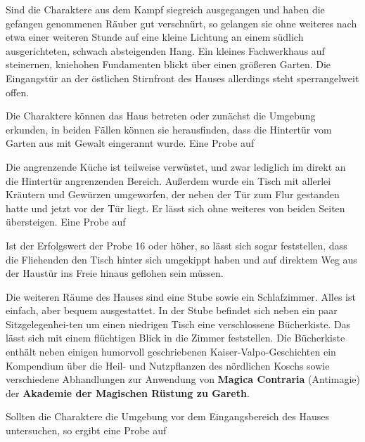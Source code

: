 


Sind die Charaktere aus dem Kampf siegreich ausgegangen und haben die gefangen genommenen Räuber gut verschnürt, so gelangen sie ohne weiteres nach etwa einer weiteren Stunde auf eine kleine Lichtung an einem südlich ausgerichteten, schwach absteigenden Hang. Ein kleines Fachwerkhaus auf steinernen, kniehohen Fundamenten blickt über einen größeren Garten. Die Eingangstür an der östlichen Stirnfront des Hauses allerdings steht sperrangelweit offen.


Die Charaktere können das Haus betreten oder zunächst die Umgebung erkunden, in beiden Fällen können sie herausfinden, dass die Hintertür vom Garten aus mit Gewalt eingerannt wurde. Eine Probe auf 



Die angrenzende Küche ist teilweise verwüstet, und zwar lediglich im direkt an die Hintertür angrenzenden Bereich. Außerdem wurde ein Tisch mit allerlei Kräutern und Gewürzen umgeworfen, der neben der Tür zum Flur gestanden hatte und jetzt vor der Tür liegt. Er lässt sich ohne weiteres von beiden Seiten übersteigen. Eine Probe auf 


Ist der Erfolgswert der Probe 16 oder höher, so lässt sich sogar feststellen, dass die Fliehenden den Tisch hinter sich umgekippt haben und auf direktem Weg aus der Haustür ins Freie hinaus geflohen sein müssen. 


Die weiteren Räume des Hauses sind eine Stube sowie ein Schlafzimmer. Alles ist einfach, aber bequem ausgestattet. In der Stube befindet sich neben ein paar Sitzgelegenhei-ten um einen niedrigen Tisch eine verschlossene Bücherkiste. Das lässt sich mit einem flüchtigen Blick in die Zimmer feststellen. Die Bücherkiste enthält neben einigen humorvoll geschriebenen Kaiser-Valpo-Geschichten ein Kompendium über die Heil- und Nutzpflanzen des nördlichen Koschs sowie verschiedene Abhandlungen zur Anwendung von \textbf{Magica Contraria} (Antimagie) der \textbf{Akademie der Magischen Rüstung zu Gareth}.

Sollten die Charaktere die Umgebung vor dem Eingangsbereich des Hauses untersuchen, so ergibt eine Probe auf 

